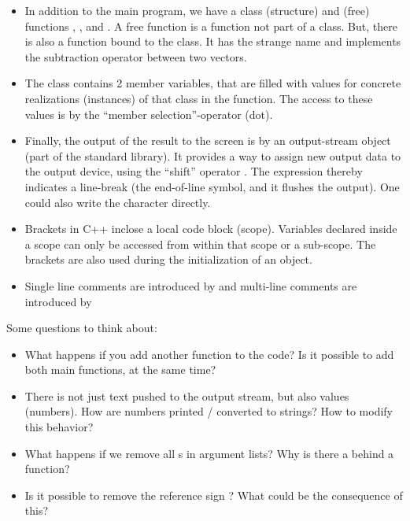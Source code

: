 \begin{itemize}
  \item In addition to the main program, we have a class (structure)  and (free) functions , , and . A free function is a function not part of a class. But, there is also a function bound to the class. It has the strange name  and implements the subtraction operator between two vectors.

  \item The class  contains 2 member variables, that are filled with values for concrete realizations (instances) of that class in the  function. The access to these values is by the ``member selection''-operator  (dot).

  \item Finally, the output of the result to the screen is by an output-stream object  (part of the standard library). It provides a way to assign new output data to the output device, using the ``shift'' operator \cpp{<<}. The expression  thereby indicates a line-break (the end-of-line symbol, and it flushes the output). One could also write the character  directly.

  \item Brackets \cpp{{ }} in C++ inclose a local code block (scope). Variables declared inside a scope can only be accessed from within that scope or a sub-scope. The brackets are also used during the initialization of an object.

  \item Single line comments are introduced by \cpp{//} and multi-line comments are introduced by 
\end{itemize}

Some questions to think about:
\begin{itemize}
  \item What happens if you add another  function to the code? Is it possible to add both main functions,  at the same time?

  \item There is not just text pushed to the output stream, but also values (numbers). How are numbers printed / converted to strings? How to modify this behavior?

  \item What happens if we remove all s in argument lists? Why is there a  behind a function?

  \item Is it possible to remove the reference sign \cpp{&}? What could be the consequence of this?
\end{itemize}


